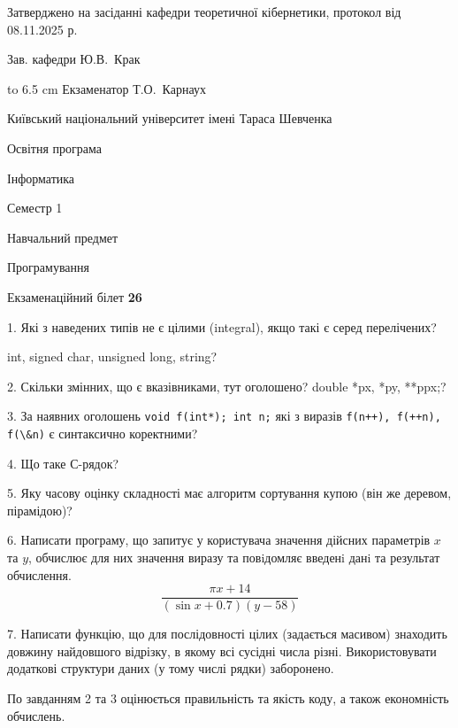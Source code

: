 \documentclass[12pt, ukrainian]{article}
\def\code#1{\Verb!#1!}
\begin{document}
{\smallskip\smallskip \begin {scriptsize} Затверджено на засіданні кафедри теоретичної кібернетики, протокол   від   08.11.2025 р.\par\smallskip\smallskip\smallskip\smallskip
{\parbox {6.5 cm} {Зав. кафедри \dotfill Ю.В.~Крак}}\hspace {0.7cm} {\hbox to 6.5 cm { Екзаменатор \dotfill Т.О.~Карнаух}} \end{scriptsize}}
\vspace{0.9cm}
{{\begin {scriptsize}\par
{ \center  Київський національний університет імені Тараса Шевченка \par}
{\parbox {5 cm}{Освітня програма \hfill}{\parbox {7 cm}{Інформатика\hfill}}\parbox {6 cm}{\hfill Семестр 1}}\par
{\parbox {5 cm} {Навчальний предмет \hfill}\parbox {7 cm}{Програмування \hfill}\parbox {6cm}{\hfill}\par}\vspace{-15pt} \end{scriptsize}}{\center Екзаменаційний білет \No \textbf { 26 }\par}}
{%
1. Які з наведених типів не є цілими (integral), якщо такі є серед перелічених?

int, signed char, unsigned long, string?
\par
\vspace{2mm}
2. Скільки змінних, що є вказівниками, тут оголошено?
double *px, *py, **ppx;?
\par
\vspace{2mm}
3. За наявних оголошень \code{void f(int*); int n;} які з виразів \code{f(n++), f(++n), f(\&n)} є синтаксично коректними?
\par
\vspace{2mm}
4. Що таке С-рядок?
\par
\vspace{2mm}
5. Яку часову оцінку складності має алгоритм сортування купою (він же деревом, пірамідою)?
\par
\vspace{2mm}
6. Написати програму, що запитує у користувача значення дійсних параметрів $x$ та $y$, обчислює для них значення виразу та повiдомляє введенi данi та результат обчислення.
$$\frac{\pi x + 14}{(\sin x + 0.7) (y - 58)}$$ 

\par
7. Написати функцію, що для послідовності цілих (задається масивом) знаходить довжину найдовшого відрізку, в якому всі сусідні числа різні. Використовувати додаткові структури даних (у тому числі рядки) заборонено.

По завданням 2 та 3 оцінюється правильність та якість коду, а також економність обчислень.

}
\end{document}
